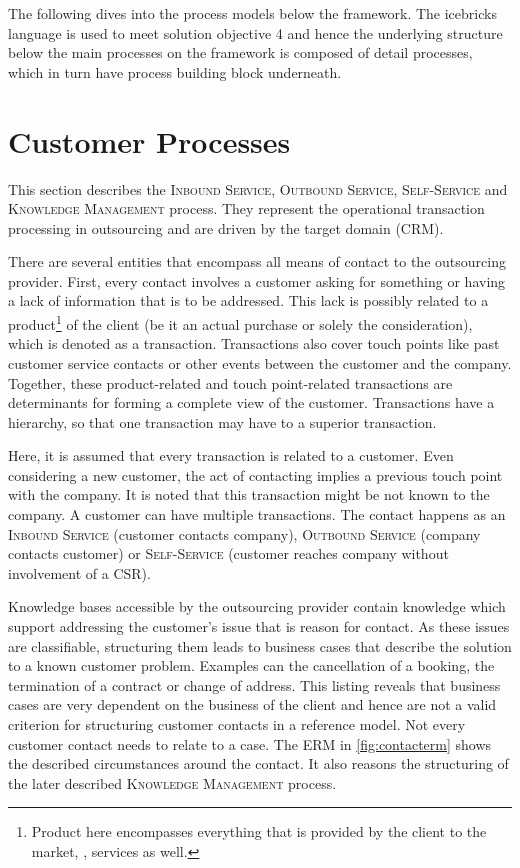 	 The following dives into the process models below the framework. The icebricks language is used to meet solution objective 4 and hence the underlying structure below the main processes on the framework is composed of detail processes, which in turn have process building block underneath. 
	 
	 
	 \section{Customer Processes}

	 
	 This section describes the \textsc{Inbound Service}, \textsc{Outbound Service}, \textsc{Self-Service} and \textsc{Knowledge Management} process. They represent the operational transaction processing in outsourcing and are driven by the target domain (\acrshort{CRM}). 
	 
	 There are several entities that encompass all means of contact to the outsourcing provider. First, every contact involves a customer asking for something or having a lack of information that is to be addressed. This lack is possibly related to a product\footnote{Product here encompasses everything that is provided by the client to the market, \ie, services as well.} of the client (be it an actual purchase or solely the consideration), which is denoted as a transaction. Transactions also cover touch points like past customer service contacts or other events between the customer and the company. Together, these product-related and touch point-related transactions are determinants for forming a complete view of the customer. Transactions have a hierarchy, so that one transaction may have to a superior transaction. 
	 
	 Here, it is assumed that every transaction is related to a customer. Even considering a new customer, the act of contacting implies a previous touch point with the company. It is noted that this transaction might be not known to the company. A customer can have multiple transactions. The contact happens as an \textsc{Inbound Service } (customer contacts company), \textsc{Outbound Service} (company contacts customer) or\textsc{ Self-Service} (customer reaches company without involvement of a \acrshort{CSR}). 
	 
	 Knowledge bases accessible by the outsourcing provider contain knowledge which support addressing the customer's issue that is reason for contact. As these issues are classifiable, structuring them leads to business cases that describe the solution to a known customer problem. Examples can the cancellation of a booking, the termination of a contract or change of address. This listing reveals that business cases are very dependent on the business of the client and hence are not a valid criterion for structuring customer contacts in a reference model. Not every customer contact needs to relate to a case. The \acrshort{ERM} in \Fig \ref{fig:contacterm} shows the described circumstances around the contact. It also reasons the structuring of the later described \textsc{Knowledge Management} process. 
	 
